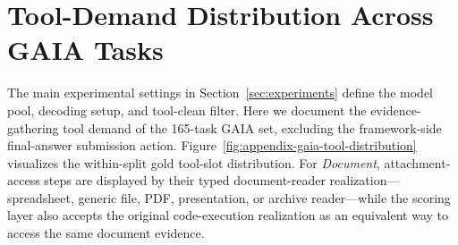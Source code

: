 \documentclass{article}
\begin{document}
\FloatBarrier

\section{Tool-Demand Distribution Across GAIA Tasks}
\label{sec:appendix-tool-distribution}

The main experimental settings in Section~\ref{sec:experiments} define the model pool, decoding setup, and tool-clean filter. Here we document the evidence-gathering tool demand of the 165-task GAIA set, excluding the framework-side final-answer submission action. Figure~\ref{fig:appendix-gaia-tool-distribution} visualizes the within-split gold tool-slot distribution. For \emph{Document}, attachment-access steps are displayed by their typed document-reader realization---spreadsheet, generic file, PDF, presentation, or archive reader---while the scoring layer also accepts the original code-execution realization as an equivalent way to access the same document evidence.
\end{document}
